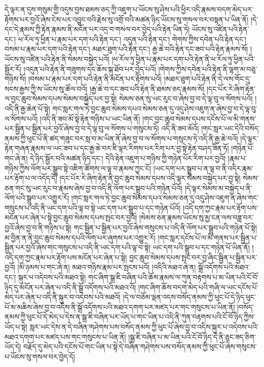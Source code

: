 དེ་ལྟར་ན་དུས་གསུམ་གྱི་འདུས་བྱས་ཐམས་ཅད་ཀྱི་འཇུག་པ་ཡོངས་སུ་ཤེས་པའི་ཕྱིར་འདི་རྣམས་བདག་མེད་པར་རྟོགས་པར་བྱའོ་ཞེས་ངེས་པར་འབྱུང་བའི་རྗེས་སུ་འགྲོ་བའི་མཚན་ཉིད་ཡོངས་སུ་གསལ་བར་བསྟན་པ་ཡིན་ནོ། །དེ་དང་དེ་རྣམས་ཀྱི་རྟེན་རྣམས་ནི་མངོན་པར་འདྲ་བ་གསལ་བར་བྱེད་པའི་རྟེན་ཡིན་ཏེ། ཡོངས་སུ་འཛིན་པའི་རྟེན་དང་། ཕ་རོལ་ཏུ་ཕྱིན་པ་རྣམ་པར་དག་པའི་རྟེན་དང་། འདུན་པའི་རྟེན་དང་། གེགས་ཀྱིས་དབེན་པའི་རྟེན་དང་། བསམ་པ་རྣམ་པར་དག་པའི་རྟེན་དང་། མཐར་ཐུག་པའི་རྟེན་དང་། རྒྱ་ཆེ་བའི་རྟེན་དང་ཟབ་པའི་རྟེན་རྣམས་སོ། །ཡོངས་སུ་འཛིན་པའི་རྟེན་ནི་སེམས་བསྐྱེད་པའོ། །ཕ་རོལ་ཏུ་ཕྱིན་པ་རྣམ་པར་དག་པའི་རྟེན་ནི་ཕ་རོལ་ཏུ་ཕྱིན་པའི་སྦྱོར་རོ། །འདུན་པའི་རྟེན་ནི་གཟུགས་དང་ཆོས་སྐུ་ཐོབ་པར་བྱེད་པའོ། །གེགས་ཀྱིས་དབེན་པའི་རྟེན་ནི་ལྷག་མ་བཅུ་གཉིས་སོ། །བསམ་པ་རྣམ་པར་དག་པའི་རྟེན་ནི་མངོན་པར་རྟོགས་པའོ། །མཐར་ཐུག་པའི་རྟེན་ནི་དེ་ལས་གོང་དུ་སངས་རྒྱས་ཀྱི་ས་ཡོངས་སུ་ཚོལ་བའོ། །རྒྱ་ཆེ་བ་དང་ཟབ་པའི་རྟེན་ནི་ཐམས་ཅད་རྣམས་སོ། །དང་པོར་རེ་ཞིག་རྟེན་ལ་བྱང་ཆུབ་སེམས་དཔས་སེམས་བསྐྱེད་པར་བྱ་སྟེ། སེམས་ཅན་སུ་ཡང་རུང་བ་ཞེས་བྱ་བ་དེ་ལྟ་བུ་ལ་སོགས་པའོ། །འདི་ནི་རྒྱ་ཆེན་པོ་སྟེ། གང་སླར་གལ་ཏེ་བྱང་ཆུབ་སེམས་དཔའ་སེམས་ཅན་དུ་འདུ་ཤེས་འཇུག་ན་ཞེས་བྱ་བ་དེ་ལྟ་བུ་ལ་སོགས་པའོ། །འདི་ནི་ཟབ་མོ་སྟེ་རྟེན་གཉིས་པ་ཡང་ཡིན་ནོ། །གང་བྱང་ཆུབ་སེམས་དཔས་དངོས་པོ་ལ་མི་གནས་པར་སྦྱིན་པ་སྦྱིན་པར་བྱའོ་ཞེས་བྱ་བ་དེ་ལྟ་བུ་ལ་སོགས་པ་གསུངས་ཏེ། འདི་ནི་ཟབ་མོའོ། །གང་སླར་ཡང་དེའི་བསོད་ནམས་ཀྱི་ཕུང་པོ་ནི་ཚད་གཟུང་བར་སླ་བ་མ་ཡིན་ནོ་ཞེས་བྱ་བ་ལ་སོགས་པ་གསུངས་ཏེ་འདི་ནི་རྒྱ་ཆེ་བའོ། །དེ་ལྟར་རྟེན་གཞན་རྣམས་ལ་ཡང་ཟབ་པ་དང་རྒྱ་ཆེ་བར་ཇི་ལྟར་རིགས་པར་རིག་པར་བྱ་སྟེ་རྟེན་བཤད་ཟིན་ཏོ། །གཉེན་པོ་གང་ཞེ་ན། དེ་ཉིད་སྦྱོར་བའི་མཚན་ཉིད་དང་། དེའི་རྟེན་འཇུག་པ་གཉིས་ཀྱི་གཉེན་པོར་རིག་པར་བྱའོ། །རྣམ་པ་གཉིས་ཀྱིས་ལོག་པར་སྒྲུབ་སྟེ་འཇིག་ཚོགས་ལ་ལྟ་བ་རྣམས་ཀྱང་ངོ། །ཡང་དག་པར་སྒྲུབ་པ་ན་ལྟ་བ་ནི་འདིར་རྣམ་པར་རྟོག་པ་ལ་འདོད་དོ། །དང་པོར་རེ་ཞིག་རྟེན་ནི་བྱང་ཆུབ་སེམས་དཔས་འདི་ལྟར་སེམས་བསྐྱེད་པར་བྱ་སྟེ། སེམས་ཅན་གང་སུ་ཡང་རུང་བ་རྣམས་ཞེས་བྱ་བ་འདི་ནི་ལོག་པར་སྒྲུབ་པའི་གཉེན་པོའོ། །དེ་ལྟར་སེམས་མ་བསྐྱེད་པ་ནི་ལོག་པའི་སྒྲུབ་པར་འགྱུར་རོ། །གང་སླར་གལ་ཏེ་བྱང་ཆུབ་སེམས་དཔའ་སེམས་ཅན་དུ་འདུ་ཤེས་འཇུག་ན་ཞེས་གང་གསུངས་པ་འདི་ནི་ཡང་དག་པའི་ལྟ་བ་སྟེ་ཡང་དག་པར་སྒྲུབ་པ་དང་གཉེན་པོའོ། །འདི་དག་ཀྱང་རྣམ་པར་རྟོག་པས་མངོན་པར་ཞེན་པ་སྟེ་བྱང་ཆུབ་སེམས་དཔས་སྤང་བར་བྱའོ། །སེམས་ཅན་རྣམས་ཡོངས་སུ་མྱ་ངན་ལས་བཟླ་བར་བྱའོ་ཞེས་བྱ་བ་ནི་གཉིས་པ་སྟེ། གང་སྦྱིན་པ་སྦྱིན་པར་བྱའོ་ཞེས་གསུངས་པ་འདི་ནི་ལོག་པར་སྒྲུབ་པའི་གཉེན་པོ་སྟེ། མ་བྱིན་ན་ནི་བྱང་ཆུབ་སེམས་དཔའི་ལོག་པར་ཞུགས་པར་འགྱུར་རོ། །གང་སླར་དངོས་པོ་ལ་མི་གནས་པར་སྦྱིན་པ་སྦྱིན་པར་བྱའོ་ཞེས་གང་གསུངས་པ་འདི་ནི་ཡང་དག་པའི་ལྟ་བ་སྟེ། ཡང་དག་པའི་སྒྲུབ་པ་དང་གཉེན་པོ་ཡིན་ནོ། །འདི་དག་ཀྱང་རྣམ་པར་རྟོག་པས་མངོན་པར་ཞེན་པ་སྟེ། བྱང་ཆུབ་སེམས་དཔས་སྤང་བར་བྱ་ཞིང་སྦྱིན་པ་སྦྱིན་པར་བྱའོ། །མི་ཉམས་པ་གང་ཞེ་ན། མཐའ་གཉིས་རྣམ་པར་སྤངས་པའོ། །འདིའི་མཐའ་ཞེ་ན། སྒྲོ་འདོགས་པའི་མཐའ་དང་། སྐུར་པ་འདེབས་པའི་མཐའ་སྟེ། གང་ཞིག་སྒྲ་ཇི་བཞིན་པའི་ཆོས་རྣམས་ལ་ཀུན་བརྟགས་པ་མ་ཡིན་པའི་ངོ་བོ་ཉིད་དུ་མངོན་པར་ཞེན་པ་འདི་ནི་སྒྲོ་འདོགས་པའི་མཐའ་འོ། །གང་ཞིག་ཆོས་བདག་མེད་པའི་གཞི་ལ་ཡང་དངོས་པོ་མེད་པར་ཞེན་པ་འདི་ནི་སྐུར་བ་འདེབས་པའི་མཐའོ། །དེ་ལ་བཅོམ་ལྡན་འདས་བསོད་ནམས་ཀྱི་ཕུང་པོ་དེ་ཉིད་ཕུང་པོ་མ་མཆིས་ཞེས་བྱ་བ་འདིས་ནི་སྒྲོ་འདོགས་པའི་མཐའ་དགག་པར་མཛད་པར་གང་གསུངས་པ་ཡིན་ནོ། །བསོད་ནམས་ཀྱི་ཕུང་པོ་དེ་མེད་པ་དེས་ན་སྒྲ་ཇི་བཞིན་པར་ཡོད་པ་གང་ཡིན་པ་འདི་ནི་ཀུན་བརྟགས་པའི་ངོ་བོ་ཉིད་ཀྱིས་ཡོད་པ་སྟེ། སླར་ཡང་དེས་ན་དེ་བཞིན་གཤེགས་པས་བསོད་ནམས་ཀྱི་ཕུང་པོ་ཞེས་བྱ་བ་འདིས་སྐུར་པ་འདེབས་པའི་མཐའ་དགག་པར་མཛད་པས་གང་གསུངས་པ་ཡིན་ནོ། །སྒྲ་ཇི་བཞིན་པ་མ་ཡིན་པའི་ངོ་བོ་ཉིད་དེ་ནི་ཅུང་ཟད་ཅིག་ཡོད་དེ། བརྗོད་དུ་མེད་པའི་དངོས་པོ་གང་ཡིན་པ་སྟེ་དེ་བཞིན་གཤེགས་པས་བསོད་ནམས་ཀྱི་ཕུང་པོ་ཞེས་གསུངས་པ་ཡོངས་སུ་གསལ་བར་བྱེད་དོ། 